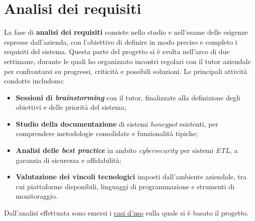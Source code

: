 \keepXColumns
\section{Analisi dei requisiti}
\label{analisi-requisiti}
La fase di \textbf{analisi dei requisiti} consiste nello studio e nell'esame delle esigenze espresse dall'azienda, con l'obiettivo di definire in modo preciso e completo i requisiti del sistema.  
Questa parte del progetto si è svolta nell'arco di due settimane, durante le quali ho organizzato incontri regolari con il tutor aziendale per confrontarsi su progressi, criticità e possibili soluzioni. Le principali attività condotte includono:
\begin{itemize}
    \item \textbf{Sessioni di \textit{brainstorming}} con il tutor, finalizzate alla definizione degli obiettivi e delle priorità del sistema;
    \item \textbf{Studio della documentazione} di sistemi \textit{honeypot} esistenti, per comprendere metodologie consolidate e funzionalità tipiche;
    \item \textbf{Analisi delle \textit{best practice}} in ambito \textit{cybersecurity} per sistemi \textit{ETL}, a garanzia di sicurezza e affidabilità;
    \item \textbf{Valutazione dei vincoli tecnologici} imposti dall'ambiente aziendale, tra cui piattaforme disponibili, linguaggi di programmazione e strumenti di monitoraggio.
\end{itemize}
Dall'analisi effettuata sono emersi i \hyperref[casi-uso]{casi d'uso} sulla quale si è basato il progetto.
